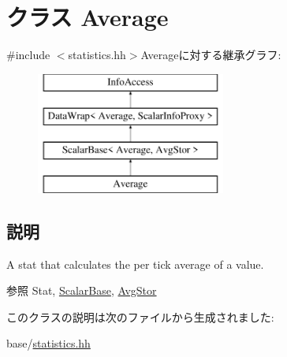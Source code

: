 \hypertarget{classStats_1_1Average}{
\section{クラス Average}
\label{classStats_1_1Average}
}


{\ttfamily \#include $<$statistics.hh$>$}Averageに対する継承グラフ:\begin{figure}[H]
\begin{center}
\leavevmode
\includegraphics[height=4cm]{classStats_1_1Average}
\end{center}
\end{figure}


\subsection{説明}
A stat that calculates the per tick average of a value. \begin{DoxySeeAlso}{参照}
Stat, \hyperlink{classStats_1_1ScalarBase}{ScalarBase}, \hyperlink{classStats_1_1AvgStor}{AvgStor} 
\end{DoxySeeAlso}


このクラスの説明は次のファイルから生成されました:\begin{DoxyCompactItemize}
\item 
base/\hyperlink{statistics_8hh}{statistics.hh}\end{DoxyCompactItemize}
